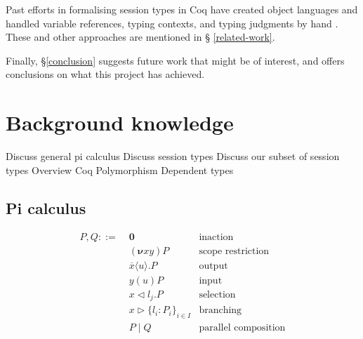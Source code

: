 \documentclass{mproj}
\newcommand{\PO}{\mathbf{0}}
\newcommand{\comp}[2]{#1 \mid #2}
\newcommand{\new}[2]{(\boldsymbol{\nu} #1 #2)}
\newcommand{\cout}[2]{\overline{#1}\langle#2\rangle.}
\newcommand{\cin}[2]{#1(#2)}
\newcommand{\select}[2]{#1\triangleleft#2.}
\newcommand{\branch}[2]{#1\triangleright#2}
\begin{document}
Past efforts in formalising session types in Coq have created object languages
and handled variable references, typing contexts, and typing judgments by hand
\cite{Dilmore2019}. These and other approaches are mentioned in \S
\ref{related-work}.

Finally, \S \ref{conclusion} suggests future work that might be of interest, and
offers conclusions on what this project has achieved.

\chapter{Background knowledge}

Discuss general pi calculus
Discuss session types
Discuss our subset of session types
Overview Coq
Polymorphism
Dependent types


\section{Pi calculus}\label{pi-calculus}


\cite{Vasconcelos2009}

\begin{align*}
P,Q ::= \; &\PO                                 & \text{inaction}             \\
           &\new{x}{y}P                         & \text{scope restriction}    \\
           &\cout{x}{u}P                        & \text{output}               \\
           &\cin{y}{u}P                         & \text{input}                \\
           &\select{x}{l_j}P                    & \text{selection}            \\
           &\branch{x}{\{l_i : P_i\}_{i \in I}} & \text{branching}            \\
           &\comp{P}{Q}                         & \text{parallel composition}
\end{align*}
\end{document}
